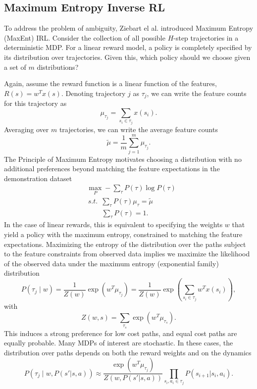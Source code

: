 \documentclass{article}
\begin{document}
\subsection{Maximum Entropy Inverse RL}

To address the problem of ambiguity, Ziebart el al. \cite{ziebart} introduced Maximum Entropy (MaxEnt) IRL. Consider the collection of all possible $H$-step trajectories in a deterministic MDP. For a linear reward model, a policy is completely specified by its distribution over trajectories. Given this, which policy should we choose given a set of $m$ distributions?

Again, assume the reward function is a linear function of the features, $R(s) = w^T x(s)$. Denoting trajectory $j$ as $\tau_j$, we can write the feature counts for this trajectory as
\begin{equation}
    \mu_{\tau_j} = \sum_{s_i \in \tau_j} x(s_i).
\end{equation}
Averaging over $m$ trajectories, we can write the average feature counts
\begin{equation}
    \tilde{\mu} = \frac{1}{m} \sum_{j=1}^m \mu_{\tau_j}.
\end{equation}
 The Principle of Maximum Entropy \cite{jaynes} motivates choosing a distribution with no additional preferences beyond matching the feature expectations in the demonstration dataset
\begin{align}
&\max_P - \sum_\tau P(\tau)\log P(\tau) \\
&\, s.t. \,\,\, \sum_\tau P(\tau) \mu_\tau = \tilde{\mu}\\
&\quad \quad \, \sum_\tau P(\tau) = 1.
\end{align}
In the case of linear rewards, this is equivalent to specifying the weights $w$ that yield a policy with the maximum entropy, constrained to matching the feature expectations. Maximizing the entropy of the distribution over the paths subject to the feature constraints from observed data implies we maximize the likelihood of the observed data under the maximum entropy (exponential family) distribution
\begin{equation*}
    P(\tau_j \mid w) = \frac{1}{Z(w)} \exp \left(w^T \mu_{\tau_j}\right) = \frac{1}{Z(w)} \exp \left(\sum_{s_i \in \tau_j} w^T x(s_i)\right),
\end{equation*}
with
\begin{equation*}
    Z(w,s) = \sum_{\tau_s} \exp \left( w^T \mu_{\tau_s} \right).
\end{equation*}
This induces a strong preference for low cost paths, and equal cost paths are equally probable. Many MDPs of interest are stochastic. In these cases, the distribution over paths depends on both the reward weights and on the dynamics
    \begin{equation*}
    P(\tau_j \mid w, P(s'|s,a)) \approx \frac{\exp \left(w^T \mu_{\tau_j}\right)}{Z(w,P(s'|s,a))}  \prod_{s_i,a_i \in \tau_{j}} P(s_{i+1}|s_i,a_i).
\end{equation*}
\end{document}
